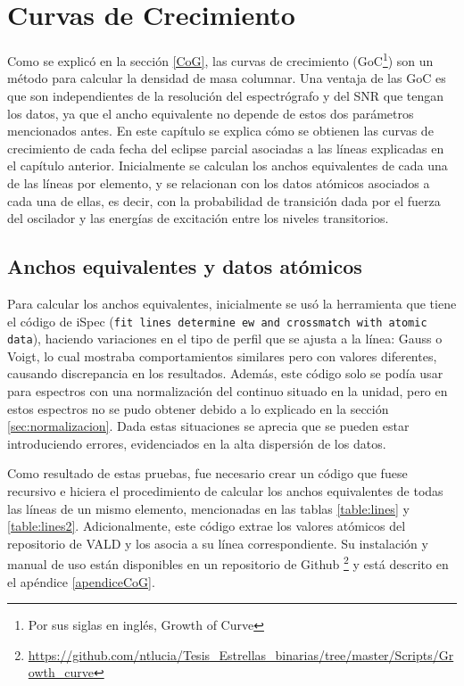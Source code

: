 \documentclass[12pt,oneside,openany,letter]{book}
\begin{document}
\chapter{Curvas de Crecimiento}\label{cap:Resultados}

Como se explicó en la sección \ref{CoG}, las curvas de crecimiento (GoC\footnote{Por sus siglas en inglés, Growth of Curve}) son un método para calcular la densidad de masa columnar. Una ventaja de las GoC es que son independientes de la resolución del espectrógrafo y del SNR que tengan los datos, ya que el ancho equivalente no depende de estos dos parámetros mencionados antes. En este capítulo se explica cómo se obtienen las curvas de crecimiento de cada fecha del eclipse parcial asociadas a las líneas explicadas en el capítulo anterior. Inicialmente se calculan los anchos equivalentes de cada una de las líneas por elemento, y se relacionan con los datos atómicos asociados a cada una de ellas, es decir, con la probabilidad de transición dada por el fuerza del oscilador y las energías de excitación entre los niveles transitorios.


\section{Anchos equivalentes y datos atómicos}

Para calcular los anchos equivalentes, inicialmente se usó la herramienta que tiene el código de iSpec (\texttt{fit lines determine ew and crossmatch with atomic data}), haciendo variaciones en el tipo de perfil que se ajusta  a la línea: Gauss o Voigt, lo cual mostraba comportamientos similares pero con valores diferentes, causando discrepancia en los resultados. Además, este código solo se podía usar para espectros con una normalización del continuo situado en la unidad, pero en estos espectros no se pudo obtener debido a lo explicado en la sección \ref{sec:normalizacion}. Dada estas situaciones se aprecia que se pueden estar introduciendo errores, evidenciados en la alta dispersión de los datos.


Como resultado de estas pruebas, fue necesario crear un código que fuese recursivo e hiciera el procedimiento de calcular los anchos equivalentes de todas las líneas de un mismo elemento, mencionadas en las tablas  \ref{table:lines} y \ref{table:lines2}. Adicionalmente, este código extrae los valores atómicos del repositorio de VALD y los asocia a su línea correspondiente. Su instalación y manual de uso están disponibles en un repositorio de Github  \footnote{\url{https://github.com/ntlucia/Tesis_Estrellas_binarias/tree/master/Scripts/Growth_curve}} y está descrito en el apéndice \ref{apendiceCoG}.
\end{document}
